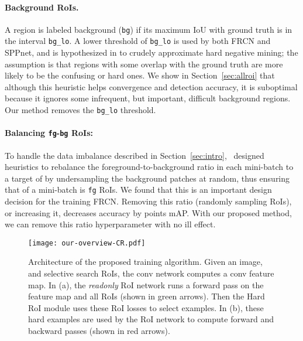 \documentclass[10pt,twocolumn,letterpaper]{article}
\begin{document}
\vspace{-0.1in}
\paragraph{Background RoIs.}  A region is labeled background (\texttt{bg}) if its maximum IoU with ground truth is in the interval \texttt{bg\_lo}. A lower threshold of \texttt{bg\_lo}  is used by both FRCN and SPPnet, and is hypothesized in \cite{frcn} to crudely approximate hard negative mining; the assumption is that regions with some overlap with the ground truth are more likely to be the confusing or hard ones. We show in Section~\ref{sec:allroi} that although this heuristic helps convergence and detection accuracy, it is suboptimal because it ignores some infrequent, but important, difficult background regions. Our method removes the \texttt{bg\_lo} threshold.

\vspace{-0.1in}
\paragraph{Balancing \texttt{fg}-\texttt{bg} RoIs:}
To handle the data imbalance described in Section~\ref{sec:intro},~\cite{frcn} designed heuristics to rebalance the foreground-to-background ratio in each mini-batch to a target of  by undersampling the background patches at random, thus ensuring that  of a mini-batch is \texttt{fg} RoIs. We found that this is an important design decision for the training FRCN. Removing this ratio (\ie randomly sampling RoIs), or increasing it, decreases accuracy by  points mAP. With our proposed method, we can remove this ratio hyperparameter with no ill effect.





\begin{figure*}[t]
	\centering
	\texttt{[image: our-overview-CR.pdf]}
	\vspace{-0.25in}
  \caption[caption]{Architecture of the proposed training algorithm. Given an image, and selective search RoIs, the conv network computes a conv feature map. In (a), the \protect\emph{readonly} RoI network runs a forward pass on the feature map and all RoIs (shown in {\protect\color{green}green} arrows). Then the Hard RoI module uses these RoI losses to select  examples. In (b), these hard examples are used by the RoI network to compute forward and backward passes (shown in {\protect\color{red}red} arrows).}
\vspace{-0.2in}
	\label{fig:overview}
\end{figure*}
\end{document}
